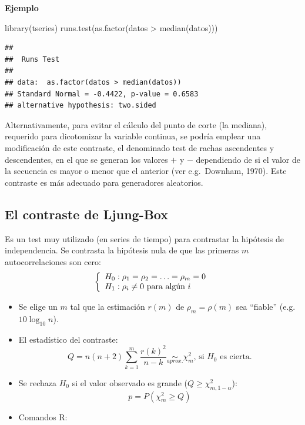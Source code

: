 \documentclass[
]{book}
\newenvironment{Shaded}{\begin{snugshade}}{\end{snugshade}}
\newcommand{\FunctionTok}[1]{\textcolor[rgb]{0.00,0.00,0.00}{#1}}
\newcommand{\NormalTok}[1]{#1}
\newcommand{\SpecialCharTok}[1]{\textcolor[rgb]{0.00,0.00,0.00}{#1}}
\theoremstyle{break}
\theoremstyle{definition}
\theoremstyle{definition}
\theoremstyle{definition}
\theoremstyle{definition}
\theoremstyle{remark}
\begin{document}
\textbf{Ejemplo}

\begin{Shaded}
\begin{Highlighting}[]
\FunctionTok{library}\NormalTok{(tseries)}
\FunctionTok{runs.test}\NormalTok{(}\FunctionTok{as.factor}\NormalTok{(datos }\SpecialCharTok{\textgreater{}} \FunctionTok{median}\NormalTok{(datos)))}
\end{Highlighting}
\end{Shaded}

\begin{verbatim}
## 
##  Runs Test
## 
## data:  as.factor(datos > median(datos))
## Standard Normal = -0.4422, p-value = 0.6583
## alternative hypothesis: two.sided
\end{verbatim}

Alternativamente, para evitar el cálculo del punto de corte (la mediana), requerido para dicotomizar la variable continua, se podría emplear una modificación de este contraste, el denominado test de rachas ascendentes y descendentes, en el que se generan los valores \(+\) y \(-\) dependiendo de si el valor de la secuencia es mayor o menor que el anterior (ver e.g.~Downham, 1970). Este contraste es más adecuado para generadores aleatorios.

\hypertarget{el-contraste-de-ljung-box}{%
\subsection{El contraste de Ljung-Box}\label{el-contraste-de-ljung-box}}

Es un test muy utilizado (en series de tiempo) para contrastar la
hipótesis de independencia.
Se contrasta la hipótesis nula de que las primeras \(m\)
autocorrelaciones son cero:
\[\left\{\begin{array}[c]{l}
    H_{0}:\rho_{1}=\rho_{2}=\ldots=\rho_{m}=0\\
    H_{1}:\rho_{i}\neq0\text{ para algún } i
\end{array}
\right.\]

\begin{itemize}
\item
  Se elige un \(m\) tal que la estimación \(r(m)\) de
  \(\rho_{m}=\rho(m)\) sea ``fiable'' (e.g.~\(10\log_{10}n\)).
\item
  El estadístico del contraste:
  \[Q=n(n+2)\sum_{k=1}^{m}\frac{r(k)^{2}}{n-k}\underset{aprox.}{\sim}\chi
  _{m}^{2}\text{, si }H_{0}\text{ es cierta.}\]
\item
  Se rechaza \(H_{0}\) si el valor observado es grande (\(Q\geq \chi_{m,1-\alpha}^{2}\)):
  \[p=P\left(  {\chi_{m}^{2}}\geq Q\right)\]
\item
  Comandos R:
\end{itemize}
\end{document}
